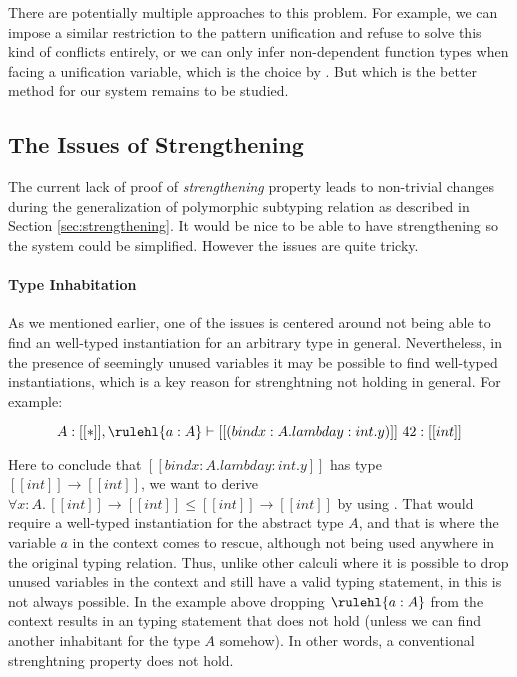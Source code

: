 There are potentially multiple approaches to this problem. For example, we can
impose a similar restriction to the pattern unification and refuse to solve
this kind of conflicts entirely, or we can only infer non-dependent function types when
facing a unification variable, which is the choice by \citet{dh}. But which is
the better method for our system remains to be studied.


\subsection{The Issues of Strengthening}
\label{sec:habitability}

The current lack of proof of \emph{strengthening} property leads to non-trivial
changes during the generalization of polymorphic subtyping relation as
described in Section \ref{sec:strengthening}. It would be nice to be able to
have strengthening so the system could be simplified. However the issues are
quite tricky.

\paragraph{Type Inhabitation}
As we mentioned earlier, one of the issues is centered around not being able to find an
well-typed instantiation for an arbitrary type in general. Nevertheless, in the presence of
seemingly unused variables it may be possible to find well-typed instantiations,
which is a key reason for strenghtning not holding in general. For example:

\begin{equation*}
    A : [[*]], \rulehl{a : A} \vdash [[(bind x : A. lambda y : int. y)]]~42 : [[int]]
\end{equation*}

Here to conclude that $[[bind x : A. lambda y : int. y]]$ has type $[[int]] \rightarrow [[int]]$,
we want to derive $\forall x : A.\, [[int]] \rightarrow [[int]] \le [[int]] \rightarrow [[int]]$ by
using . That would require a well-typed instantiation
for the abstract type $A$, and that is where the variable $a$ in the context
comes to rescue, although not being used anywhere in the original typing relation.
Thus, unlike other calculi where it is possible to drop unused variables in the context
and still have a valid typing statement, in \name this is not always possible. In the example
above dropping $\rulehl{a : A}$ from the context results in an typing statement that does not hold
(unless we can find another inhabitant for the type $A$ somehow).
In other words, a conventional strenghtning property does not hold.

